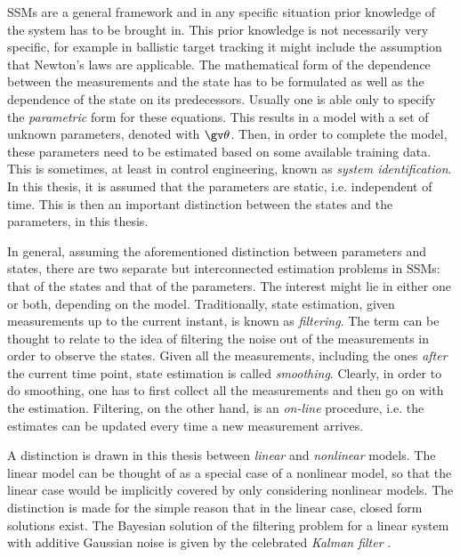 SSMs are a general framework and in any specific situation prior knowledge of the
system has to be brought in. This prior knowledge is not necessarily very specific,
for example in ballistic target tracking it might include the assumption that Newton's
laws are applicable. The mathematical form of the dependence
between the measurements and the state has to be formulated as well as the dependence
of the state on its predecessors. Usually one is able only to specify the 
\emph{parametric} form for these equations. This results in a model with a set
of unknown parameters, denoted with $\Th$. Then, in order
to complete the model, these parameters need to be estimated based on some available
training data. This is sometimes, at least
in control engineering, known as \emph{system identification}. In this thesis,
it is assumed that the parameters are static, i.e. independent of time. 
This is then an important distinction between the states and
the parameters, in this thesis.

In general, assuming the aforementioned distinction between parameters and states, there are two separate but
interconnected estimation problems in SSMs: that of the states and that of the parameters. The interest might
lie in either one or both, depending on the model. Traditionally, state
estimation, given measurements up to the current instant, is known as \emph{filtering}.
The term can be thought to relate to the idea of filtering the noise out of the measurements
in order to observe the states. Given all the measurements, including the ones
\emph{after} the current time point, state estimation is called \emph{smoothing}.
Clearly, in order to do smoothing, one has to first collect all the measurements
and then go on with the estimation. Filtering, on the other hand, is an \emph{on-line}
procedure, i.e. the estimates can be updated every time a new measurement arrives.

A distinction is drawn in this thesis between \emph{linear} and \emph{nonlinear}
models. The linear model can be thought of as a special case of a nonlinear model,
so that the linear case would be implicitly covered by only considering nonlinear models.
The distinction is made for the simple reason that in the linear case, closed
form solutions exist. The Bayesian solution of the filtering problem for a linear system
with additive Gaussian noise is given by the celebrated \emph{Kalman filter} \parencite{Kalman1960}.

